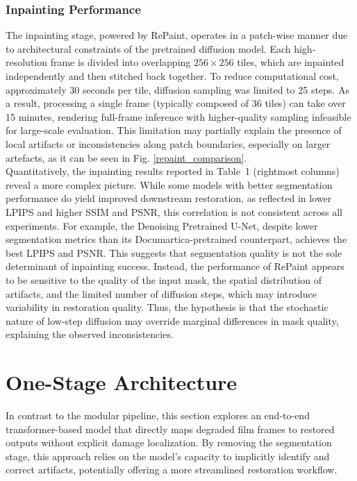 \documentclass[10pt,a4paper,twocolumn,twoside]{article}
\begin{document}
\subsubsection{Inpainting Performance}
The inpainting stage, powered by RePaint, operates in a patch-wise manner due to architectural constraints of the pretrained diffusion model. Each high-resolution frame is divided into overlapping $256 \times 256$ tiles, which are inpainted independently and then stitched back together. To reduce computational cost, approximately 30 seconds per tile, diffusion sampling was limited to 25 steps. As a result, processing a single frame (typically composed of 36 tiles) can take over 15 minutes, rendering full-frame inference with higher-quality sampling infeasible for large-scale evaluation. This limitation may partially explain the presence of local artifacts or inconsistencies along patch boundaries, especially on larger artefacts, as it can be seen in Fig. \ref{repaint_comparison}.\\ 
Quantitatively, the inpainting results reported in Table~1 (rightmost columns) reveal a more complex picture. While some models with better segmentation performance do yield improved downstream restoration, as reflected in lower LPIPS and higher SSIM and PSNR, this correlation is not consistent across all experiments. For example, the Denoising Pretrained U-Net, despite lower segmentation metrics than its Documartica-pretrained counterpart, achieves the best LPIPS and PSNR. This suggests that segmentation quality is not the sole determinant of inpainting success. Instead, the performance of RePaint appears to be sensitive to the quality of the input mask, the spatial distribution of artifacts, and the limited number of diffusion steps, which may introduce variability in restoration quality. Thus, the hypothesis is that the stochastic nature of low-step diffusion may override marginal differences in mask quality, explaining the observed inconsistencies.


\section{One-Stage Architecture}
In contrast to the modular pipeline, this section explores an end-to-end transformer-based model that directly maps degraded film frames to restored outputs without explicit damage localization. By removing the segmentation stage, this approach relies on the model’s capacity to implicitly identify and correct artifacts, potentially offering a more streamlined restoration workflow.
\end{document}
